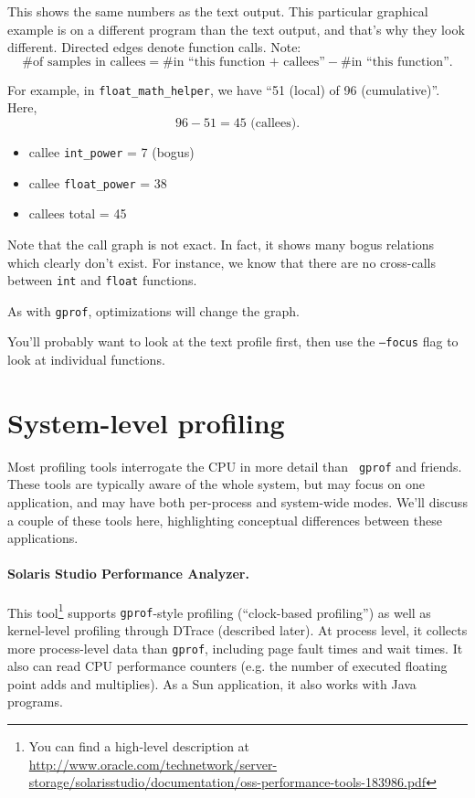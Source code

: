 \documentclass[a4paper]{report}
\begin{document}
This shows the same numbers as the text output. This particular graphical example is on a different program than the text output, and that's why they look different. Directed edges denote function calls.
Note: 
\[ \mbox{\# of samples in callees} = \mbox{\# in ``this function + callees''} - \mbox{\# in ``this function''}.\]

For example, in {\tt float\_math\_helper}, we have ``51 (local) of 96 (cumulative)''.
Here,
\[ 96 - 51 = 45 \mbox{ (callees)}. \]
      \begin{itemize}
        \item callee {\tt int\_power} = 7 (bogus)
        \item callee {\tt float\_power} = 38
        \item callees total = 45
      \end{itemize}

Note that the call graph is not exact.
In fact, it shows many bogus relations which clearly don't exist.
For instance, we know that there are no cross-calls between {\tt int} and {\tt float} functions.

As with {\tt gprof}, optimizations will change the
      graph.\

You'll probably want to look at the text profile first, then use the
      {\tt --focus} flag to look at individual functions.

      \section*{System-level profiling}
Most profiling tools interrogate the CPU in more detail than {\tt
  gprof} and friends. These tools are typically aware of the whole
system, but may focus on one application, and may have both
per-process and system-wide modes. We'll discuss a couple of these
tools here, highlighting conceptual differences between these
applications.

\paragraph{Solaris Studio Performance Analyzer.} This 
tool\footnote{You can find a high-level description at
  \url{http://www.oracle.com/technetwork/server-storage/solarisstudio/documentation/oss-performance-tools-183986.pdf}}
supports {\tt gprof}-style profiling (``clock-based profiling'') as
well as kernel-level profiling through DTrace (described later). At
process level, it collects more process-level data than {\tt gprof},
including page fault times and wait times. It also can read CPU
performance counters (e.g. the number of executed floating point adds
and multiplies).  As a Sun application, it also works with Java
programs.
\end{document}
